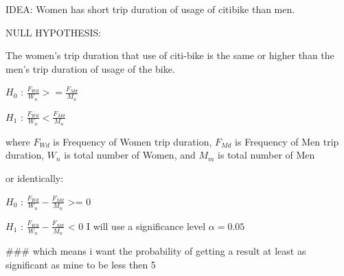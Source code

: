IDEA:
Women has short trip duration of usage of citibike than men.

NULL HYPOTHESIS:

The women's trip duration that use of citi-bike is the same or higher than the men's trip duration of usage of the bike.

$H_0$ : $\frac{F_{Wd}}{W_{n}} >= \frac{F_{Md}}{M_{n}} $ 

$H_1$ : $\frac{F_{Wd}}{W_{n}} < \frac{F_{Md}}{M_{n}} $

where $F_{Wd}$ is Frequency of Women trip duration, $F_{Md}$ is Frequency of Men trip duration, ${W_{n}}$ is total number of Women, and ${M_{m}}$ is total number of Men

or identically:

$H_0$ : $\frac{F_{Wd}}{W_{n}} - \frac{F_{Md}}{M_{n}} $ >= 0

$H_1$ : $\frac{F_{Wd}}{W_{n}} - \frac{F_{Md}}{M_{n}} $ < 0
 I will use a significance level  $\alpha=0.05$

### which means i want the probability of getting a result at least as significant as mine to be less then 5 %